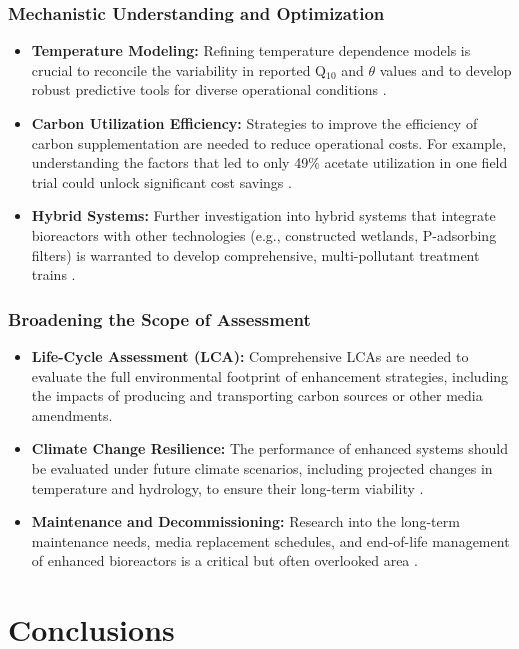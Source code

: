 \documentclass[12pt,a4paper]{article}
\begin{document}
\subsubsection{Mechanistic Understanding and Optimization}
\begin{itemize}[leftmargin=*]
    \item \textbf{Temperature Modeling:} Refining temperature dependence models is crucial to reconcile the variability in reported Q$_{10}$ and $\theta$ values and to develop robust predictive tools for diverse operational conditions \citep{RN242, RN258}.
    \item \textbf{Carbon Utilization Efficiency:} Strategies to improve the efficiency of carbon supplementation are needed to reduce operational costs. For example, understanding the factors that led to only 49\% acetate utilization in one field trial could unlock significant cost savings \citep{RN242}.
    \item \textbf{Hybrid Systems:} Further investigation into hybrid systems that integrate bioreactors with other technologies (e.g., constructed wetlands, P-adsorbing filters) is warranted to develop comprehensive, multi-pollutant treatment trains \citep{RN625}.
\end{itemize}

\subsubsection{Broadening the Scope of Assessment}
\begin{itemize}[leftmargin=*]
    \item \textbf{Life-Cycle Assessment (LCA):} Comprehensive LCAs are needed to evaluate the full environmental footprint of enhancement strategies, including the impacts of producing and transporting carbon sources or other media amendments.
    \item \textbf{Climate Change Resilience:} The performance of enhanced systems should be evaluated under future climate scenarios, including projected changes in temperature and hydrology, to ensure their long-term viability \citep{RN1181}.
    \item \textbf{Maintenance and Decommissioning:} Research into the long-term maintenance needs, media replacement schedules, and end-of-life management of enhanced bioreactors is a critical but often overlooked area \citep{RN629}.
\end{itemize}

\section{Conclusions}
\end{document}
